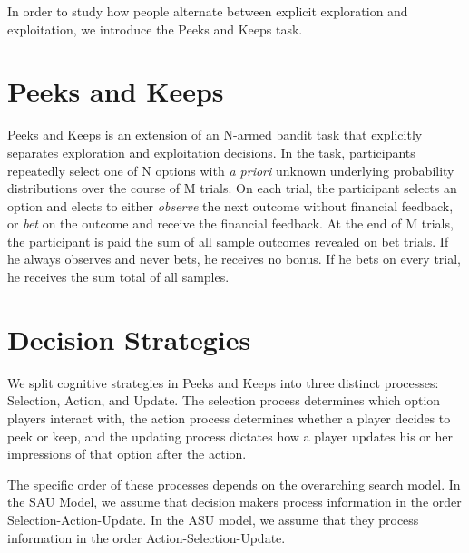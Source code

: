 \documentclass[a4paper,doc,natbib,floatsintext]{apa6}\usepackage[]{graphicx}\usepackage[]{color}
\begin{document}
In order to study how people alternate between explicit exploration and exploitation, we introduce the Peeks and Keeps task.


\section{Peeks and Keeps}

Peeks and Keeps is an extension of an N-armed bandit task that explicitly separates exploration and exploitation decisions. In the task, participants repeatedly select one of N options with \textit{a priori} unknown underlying probability distributions over the course of M trials. On each trial, the participant selects an option and elects to either \textit{observe} the next outcome without financial feedback, or \textit{bet} on the outcome and receive the financial feedback. At the end of M trials, the participant is paid the sum of all sample outcomes revealed on bet trials. If he always observes and never bets, he receives no bonus. If he bets on every trial, he receives the sum total of all samples.

\section{Decision Strategies}

We split cognitive strategies in Peeks and Keeps into three distinct processes: Selection, Action, and Update. The selection process determines which option players interact with, the action process determines whether a player decides to peek or keep, and the updating process dictates how a player updates his or her impressions of that option after the action.

The specific order of these processes depends on the overarching search model. In the SAU Model, we assume that decision makers process information in the order Selection-Action-Update. In the ASU model, we assume that they process information in the order Action-Selection-Update.
\end{document}
